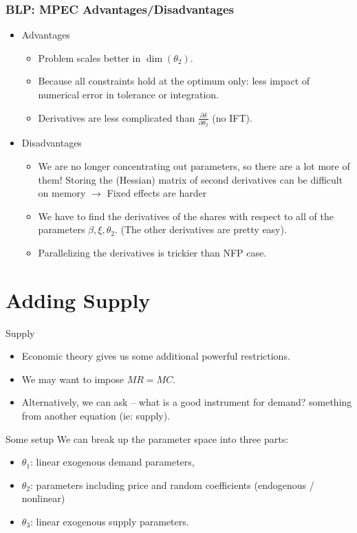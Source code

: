 \documentclass[aspectratio=169,10pt]{beamer}
\begin{document}
\begin{frame}
\frametitle{BLP: MPEC Advantages/Disadvantages}
\begin{itemize}
\item Advantages
\begin{itemize}
\item Problem scales better in $\dim(\theta_2)$.
\item Because all constraints hold at the optimum only: less impact of numerical error in tolerance or integration.
\item Derivatives are less complicated than $\frac{\partial \delta}{\partial \theta_2}$ (no IFT).
\end{itemize}
\item Disadvantages
\begin{itemize}
\item We are no longer concentrating out parameters, so there are a lot more of them! Storing the (Hessian) matrix of second derivatives can be difficult on memory $\rightarrow$ Fixed effects are harder
\item We have to find the derivatives of the shares with respect to all of the parameters $\beta,\xi,\theta_2$. (The other derivatives are pretty easy).
\item Parallelizing the derivatives is trickier than NFP case.
\end{itemize}
\end{itemize}
\end{frame}



\section{Adding Supply}
\begin{frame}{Supply}
\begin{itemize}
\item Economic theory gives us some additional powerful restrictions.
\item We may want to impose $MR = MC$.
\item Alternatively, we can ask -- what is a good instrument for demand? \alert{something from another equation} (ie: supply).
\end{itemize}
\end{frame}

\begin{frame}{Some setup}
We can break up the parameter space into three parts:
\begin{itemize}
\item $\theta_1$: linear exogenous demand parameters, 
 \item $\theta_2$: parameters including price and random coefficients (endogenous / nonlinear)
 \item $\theta_3$: linear exogenous supply parameters.
\end{itemize}
\end{frame}
\end{document}
